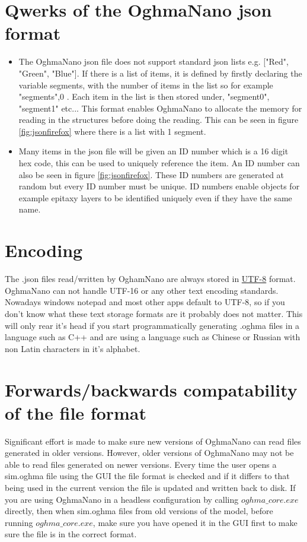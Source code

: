 \section{Qwerks of the OghmaNano json format}
\begin{itemize}
  \item The OghmaNano json file does not support standard json lists e.g. ["Red", "Green", "Blue"].  If there is a list of items, it is defined by firstly declaring the variable segments, with the number of items in the list so for example "segments",0 . Each item in the list is then stored under, "segment0", "segment1" etc... This format enables OghmaNano to allocate the memory for reading in the structures before doing the reading.  This can be seen in figure \ref{fig:jsonfirefox} where there is a list with 1 segment.
  \item Many items in the json file will be given an ID number which is a 16 digit hex code, this can be used to uniquely reference the item.  An ID number can also be seen in figure \ref{fig:jsonfirefox}.  These ID numbers are generated at random but every ID number must be unique. ID numbers enable objects for example epitaxy layers to be identified uniquely even if they have the same name.
\end{itemize}

\section{Encoding}
The .json files read/written by OghamNano are always stored in \href{https://en.wikipedia.org/wiki/UTF-8}{UTF-8} format. OghmaNano can not handle UTF-16 or any other text encoding standards. Nowadays windows notepad and most other apps default to UTF-8, so if you don't know what these text storage formats are it probably does not matter. This will only rear it's head if you start programmatically generating .oghma files in a language such as C++ and are using a language such as Chinese or Russian with non Latin characters in it's alphabet.

\section{Forwards/backwards compatability of the file format}
Significant effort is made to make sure new versions of OghmaNano can read files generated in older versions. However, older versions of OghmaNano may not be able to read files generated on newer versions. Every time the user opens a sim.oghma file using the GUI the file format is checked and if it differs to that being used in the current version the file is updated and written back to disk. If you are using OghmaNano in a headless configuration by calling $oghma\_core.exe$ directly, then when sim.oghma files from old versions of the model, before running $oghma\_core.exe$, make sure you have opened it in the GUI first to make sure the file is in the correct format.








